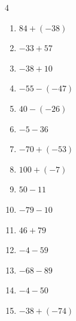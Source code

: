 \begin{multicols}{4}
\begin{enumerate}
        \phantom{$=123$}

  \item $84+(-38)$

        \phantom{$=46$}

  \item $-33+57$

        \phantom{$=24$}

  \item $-38+10$

        \phantom{$=-28$}

  \item $-55-(-47)$

        \phantom{$=-8$}

  \item $40-(-26)$

        \phantom{$=66$}

  \item $-5-36$

        \phantom{$=-41$}

  \item $-70+(-53)$

        \phantom{$=-123$}

  \item $100+(-7)$

        \phantom{$=93$}

\columnbreak %

\resetques

  \item $50-11$

        \phantom{$=39$}

  \item $-79-10$

        \phantom{$=-89$}

  \item $46+79$

        \phantom{$=125$}

  \item $-4-59$

        \phantom{$=-63$}

  \item $-68-89$

        \phantom{$=-157$}

  \item $-4-50$

        \phantom{$=-54$}

  \item $-38+(-74)$

        \phantom{$=-112$}


\end{enumerate}
\end{multicols}
